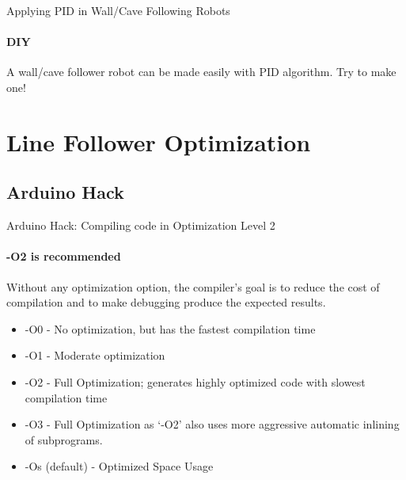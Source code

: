 \documentclass{beamer}
\begin{document}
  \begin{frame}{Applying PID in Wall/Cave Following Robots}
  
  \framesubtitle{DIY}
  
  	A wall/cave follower robot can be made easily with PID algorithm. Try to make one!
  
  \end{frame}
  
  
  \section{Line Follower Optimization}
  
  \subsection{Arduino Hack}
  \begin{frame}[allowframebreaks]{Arduino Hack: Compiling code in Optimization Level 2}
  \framesubtitle{-O2 is recommended}
  	
  	Without any optimization option, the compiler's goal is to reduce the cost of compilation and to make debugging produce the expected results. 
			 	

	\begin{itemize}
		
		\item{\alert{-O0} - No optimization, but has the fastest compilation time}
		
		\item{\alert{-O1} - Moderate optimization}
		
		
		\item{\alert{-O2} - Full Optimization; generates highly optimized code with slowest compilation time}
		
		\item{\alert{-O3} - Full Optimization as `-O2' also uses more aggressive automatic inlining of subprograms.}
		
		\item{\alert{-Os (default)} - Optimized Space Usage}	
	
	\end{itemize}

  
  
  \end{frame}
  
\end{document}
